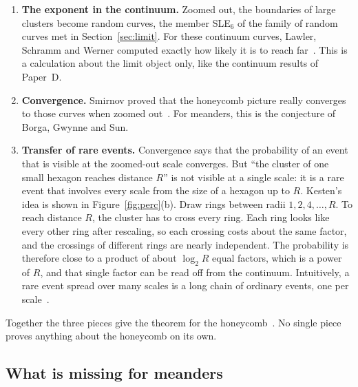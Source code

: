 \begin{enumerate}
\item \textbf{The exponent in the continuum.} Zoomed out, the boundaries of large clusters become
random curves, the member SLE$_6$ of the family of random curves met in Section~\ref{sec:limit}.
For these continuum curves, Lawler, Schramm and Werner computed exactly how likely it is to reach
far~\cite{LSW}. This is a calculation about the limit object only, like the continuum results of
Paper~D.
\item \textbf{Convergence.} Smirnov proved that the honeycomb picture really converges to those
curves when zoomed out~\cite{Smirnov}. For meanders, this is the conjecture of Borga, Gwynne and
Sun.
\item \textbf{Transfer of rare events.} Convergence says that the probability of an event that is
visible at the zoomed-out scale converges. But ``the cluster of one small hexagon reaches distance
$R$'' is not visible at a single scale: it is a rare event that involves every scale from the size
of a hexagon up to $R$. Kesten's idea is shown in Figure~\ref{fig:perc}(b). Draw rings between
radii $1,2,4,\ldots,R$. To reach distance $R$, the cluster has to cross every ring. Each ring looks
like every other ring after rescaling, so each crossing costs about the same factor, and the
crossings of different rings are nearly independent. The probability is therefore close to a
product of about $\log_2 R$ equal factors, which is a power of $R$, and that single factor can be
read off from the continuum. Intuitively, a rare event spread over many scales is a long chain of
ordinary events, one per scale~\cite{Kesten}.
\end{enumerate}
Together the three pieces give the theorem for the honeycomb~\cite{LSW,SW}. No single piece
proves anything about the honeycomb on its own.

\subsection{What is missing for meanders}

